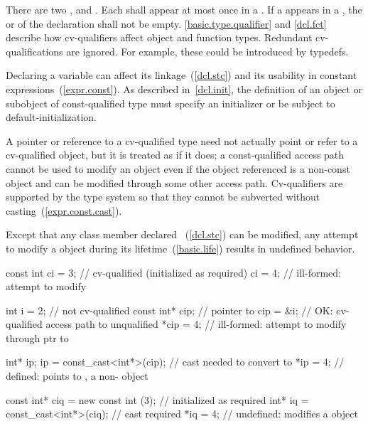 \pnum
There are two ,  and
. Each  shall appear at most once in
a . If a  appears in a
, the 
or  of
the declaration shall not be empty.
\enternote
\ref{basic.type.qualifier} and \ref{dcl.fct} describe how cv-qualifiers affect object and
function types.
\exitnote
Redundant cv-qualifications are ignored. \enternote For example,
these could be introduced by typedefs.\exitnote

\pnum
\enternote
Declaring a variable  can affect its linkage~(\ref{dcl.stc})
and its usability in constant expressions~(\ref{expr.const}). As
described in~\ref{dcl.init}, the definition of an object or subobject
of const-qualified type must specify an initializer or be subject to
default-initialization.
\exitnote

\pnum
A pointer or reference to a cv-qualified type need not actually point or
refer to a cv-qualified object, but it is treated as if it does; a
const-qualified access path cannot be used to modify an object even if
the object referenced is a non-const object and can be modified through
some other access path.
\enternote
Cv-qualifiers are supported by the type system so that they cannot be
subverted without casting~(\ref{expr.const.cast}).
\exitnote

\pnum
{}%
Except that any class member declared ~(\ref{dcl.stc})
can be modified, any attempt to modify a  object during its
lifetime~(\ref{basic.life}) results in undefined behavior.
\enterexample

\begin{codeblock}
const int ci = 3;               // cv-qualified (initialized as required)
ci = 4;                         // ill-formed: attempt to modify 

int i = 2;                      // not cv-qualified
const int* cip;                 // pointer to 
cip = &i;                       // OK: cv-qualified access path to unqualified
*cip = 4;                       // ill-formed: attempt to modify through ptr to 

int* ip;
ip = const_cast<int*>(cip);     // cast needed to convert  to 
*ip = 4;                        // defined:  points to , a non- object

const int* ciq = new const int (3);     // initialized as required
int* iq = const_cast<int*>(ciq);        // cast required
*iq = 4;                                // undefined: modifies a  object
\end{codeblock}


